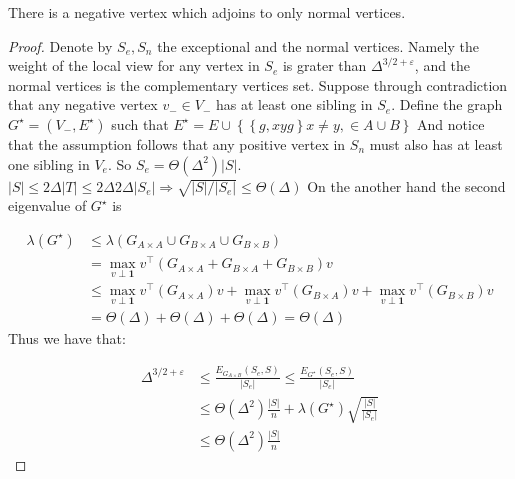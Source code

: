 \begin{claim}
  There is a negative vertex which adjoins to only normal vertices. 
\end{claim}
\begin{proof}
  Denote by $S_{e},S_{n}$ the exceptional and the normal vertices. Namely the weight of the local view for any vertex in $S_{e}$ is grater than $\Delta^{3/2 + \varepsilon}$, and the normal vertices is the complementary vertices set. Suppose through contradiction that any negative vertex $v_{-}\in V_{-}$ has at least one sibling in $S_{e}$. Define the graph $G^{\star} = (V_{-}, E^{\star})$ such that $E^{\star} = E \cup \left\{ \left\{g, xyg \right\} x\neq y, \in A\cup B \right\}$ And notice that the assumption follows that  any positive vertex in $S_{n}$ must also has at least one sibling in $V_{e}$. So $S_{e} = \Theta\left( \Delta^{2}\right)|S|$. $|S| \le 2\Delta |T| \le  2\Delta 2\Delta |S_{e}| \Rightarrow \sqrt{|S|/|S_{e}|} \le \Theta\left( \Delta \right)$ 
  On the another hand the second eigenvalue of $G^{\star}$ is 

  \begin{equation*}
    \begin{split}
      \lambda\left( G^{\star} \right) & \le  \lambda\left( G_{A \times A} \cup G_{B \times A} \cup G_{B \times B} \right) \\
      & = \max_{v \perp \mathbf{1}} v^{\top} \left( G_{A \times A}  +  G_{B \times A} + G_{B \times B} \right) v \\
      & \le \max_{v \perp \mathbf{1}} v^{\top} \left( G_{A \times A} \right) v + \max_{v \perp \mathbf{1}} v^{\top} \left(   G_{B \times A} \right) v + \max_{v \perp \mathbf{1}} v^{\top} \left( G_{B \times B} \right) v \\ 
      & = \Theta(\Delta) + \Theta(\Delta) + \Theta(\Delta) = \Theta(\Delta) 
    \end{split}
  \end{equation*} 
  Thus we have that: 

  \begin{equation*}
    \begin{split}
      \Delta^{3/2+\varepsilon} & \le \frac{E_{G_{A\times B}}\left( S_{e},S \right)}{|S_{e}|}\le  \frac{E_{G^{\star}}\left( S_{e},S \right)}{|S_{e}|} \\
      & \le \Theta\left( \Delta^{2} \right) \frac{  |S| }{n} +  \lambda\left( G^{\star} \right) \sqrt{ \frac{ |S|}{ |S_{e}|} } \\
      & \le \Theta\left( \Delta^{2} \right) \frac{|S|}{n}   
    \end{split}
  \end{equation*}
\end{proof}

